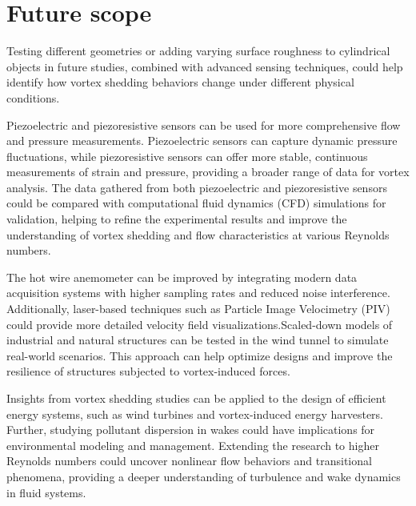 \section{Future scope}

Testing different geometries or adding varying surface roughness to cylindrical objects in future studies, combined with advanced sensing techniques, could help identify how vortex shedding behaviors change under different physical conditions.

Piezoelectric and piezoresistive sensors can be used for more comprehensive flow and pressure measurements. Piezoelectric sensors can capture dynamic pressure fluctuations, while piezoresistive sensors can offer more stable, continuous measurements of strain and pressure, providing a broader range of data for vortex analysis. The data gathered from both piezoelectric and piezoresistive sensors could be compared with computational fluid dynamics (CFD) simulations for validation, helping to refine the experimental results and improve the understanding of vortex shedding and flow characteristics at various Reynolds numbers.

The hot wire anemometer can be improved by integrating modern data acquisition systems with higher sampling rates and reduced noise interference. Additionally, laser-based techniques such as Particle Image Velocimetry (PIV) could provide more detailed velocity field visualizations.Scaled-down models of industrial and natural structures can be tested in the wind tunnel to simulate real-world scenarios. This approach can help optimize designs and improve the resilience of structures subjected to vortex-induced forces.

Insights from vortex shedding studies can be applied to the design of efficient energy systems, such as wind turbines and vortex-induced energy harvesters. Further, studying pollutant dispersion in wakes could have implications for environmental modeling and management. Extending the research to higher Reynolds numbers could uncover nonlinear flow behaviors and transitional phenomena, providing a deeper understanding of turbulence and wake dynamics in fluid systems.




